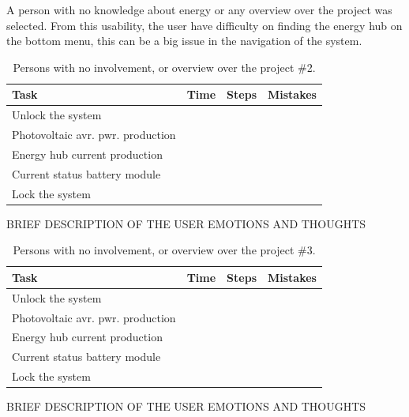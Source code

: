 A person with no knowledge about energy or any overview over the project was selected. From this usability, the user have difficulty on finding the energy hub on the bottom menu, this can be a big issue in the navigation of the system. 

\begin{table}[H]
\begin{tabular}{ | l | l | l | l |}
	\hline
	Task & Time & Steps & Mistakes \\ \hline
	Unlock the system & & & \\ \hline
	Photovoltaic avr. pwr. production & & & \\ \hline
	Energy hub current production & & & \\ \hline
	Current status battery module & & & \\ \hline
	Lock the system & & & \\ \hline
\end{tabular}
\caption{Persons with no involvement, or overview over the project \#2.}
\end{table}

BRIEF DESCRIPTION OF THE USER EMOTIONS AND THOUGHTS\\

\begin{table}[H]
\begin{tabular}{ | l | l | l | l |}
	\hline
	Task & Time & Steps & Mistakes \\ \hline
	Unlock the system & & & \\ \hline
	Photovoltaic avr. pwr. production & & & \\ \hline
	Energy hub current production & & & \\ \hline
	Current status battery module & & & \\ \hline
	Lock the system & & & \\ \hline
\end{tabular}
\caption{Persons with no involvement, or overview over the project \#3.}
\end{table}

BRIEF DESCRIPTION OF THE USER EMOTIONS AND THOUGHTS




